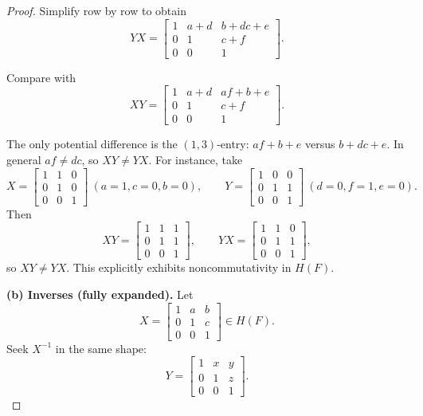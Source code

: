 \documentclass[12pt]{article}
\theoremstyle{definition}
\begin{document}
\begin{proof}
Simplify row by row to obtain
\[
YX=\begin{bmatrix}
1 & a+d & b+dc+e\\[2pt]
0 & 1 & c+f\\[2pt]
0 & 0 & 1
\end{bmatrix}.
\]

Compare with
\[
XY=\begin{bmatrix}
1 & a+d & af+b+e\\[2pt]
0 & 1 & c+f\\[2pt]
0 & 0 & 1
\end{bmatrix}.
\]

The only potential difference is the \((1,3)\)-entry: \(af+b+e\) versus \(b+dc+e\).
In general \(af\neq dc\), so \(XY\neq YX\).
For instance, take
\[
X=\begin{bmatrix}1&1&0\\ 0&1&0\\ 0&0&1\end{bmatrix}\ (a=1,c=0,b=0),\qquad
Y=\begin{bmatrix}1&0&0\\ 0&1&1\\ 0&0&1\end{bmatrix}\ (d=0,f=1,e=0).
\]
Then
\[
XY=\begin{bmatrix}1&1&1\\ 0&1&1\\ 0&0&1\end{bmatrix},\qquad
YX=\begin{bmatrix}1&1&0\\ 0&1&1\\ 0&0&1\end{bmatrix},
\]
so \(XY\ne YX\). This explicitly exhibits noncommutativity in \(H(F)\).

\smallskip
\textbf{(b) Inverses (fully expanded).}
Let 
\[
X=\begin{bmatrix}1&a&b\\[2pt]0&1&c\\[2pt]0&0&1\end{bmatrix}\in H(F).
\]
Seek $X^{-1}$ in the same shape:
\[
Y=\begin{bmatrix}1&x&y\\[2pt]0&1&z\\[2pt]0&0&1\end{bmatrix}.
\]


\end{proof}
\end{document}
